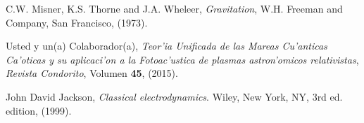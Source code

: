 \documentclass[11pt]{exam}
\begin{document}
\begin{thebibliography}{99}
 C.W. Misner, K.S. Thorne and J.A. Wheleer,
{\em Gravitation}, W.H. Freeman and Company, San Francisco, (1973).

 Usted y un(a) Colaborador(a), {\it Teor'ia Unificada de las Mareas Cu'anticas Ca'oticas y su aplicaci'on a la Fotoac'ustica de plasmas astron'omicos relativistas}, {\sl Revista Condorito}, Volumen \textbf{45}, (2015).

 John David Jackson, {\it Classical electrodynamics}. Wiley, New York, NY, 3rd ed. edition, (1999).
\end{thebibliography}
\end{document}
